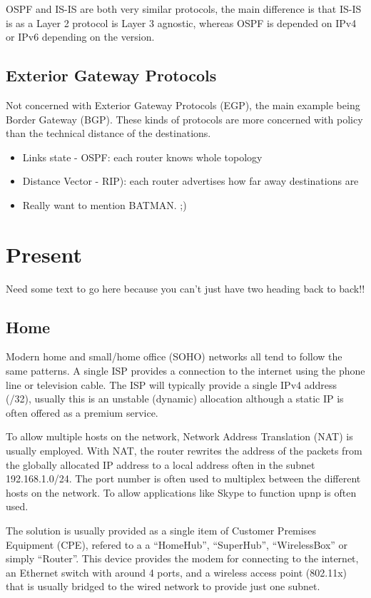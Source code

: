 \documentclass[12pt]{report}
\begin{document}
OSPF and IS-IS are both very similar protocols, the main difference is that
IS-IS is as a Layer 2 protocol is Layer 3 agnostic, whereas OSPF is depended on
IPv4 or IPv6 depending on the version.

\subsection{Exterior Gateway Protocols}
Not concerned with Exterior Gateway Protocols (EGP), the main example being
Border Gateway (BGP). These kinds of protocols are more concerned with policy
than the technical distance of the destinations.

\begin{itemize}
\item Links state - OSPF: each router knows whole topology
\item Distance Vector - RIP): each router advertises how far away destinations are
\item Really want to mention BATMAN. ;)
\end{itemize}

\section{Present}
Need some text to go here because you can't just have two heading back to back!!

\subsection{Home}
Modern home and small/home office (SOHO) networks all tend to follow the same
patterns. A single ISP provides a connection to the internet using the phone
line or television cable.  The ISP will typically provide a single IPv4 address
(/32), usually this is an unstable (dynamic) allocation although a static IP is
often offered as a premium service. 

To allow multiple hosts on the network, Network Address Translation (NAT) is
usually employed. With NAT, the router rewrites the address of the packets from
the globally allocated IP address to a local address often in the subnet
192.168.1.0/24. The port number is often used to multiplex between the
different hosts on the network. To allow applications like Skype to function
upnp is often used. 

The solution is usually provided as a single item of Customer Premises
Equipment (CPE), refered to a a ``HomeHub'', ``SuperHub'', ``WirelessBox'' or
simply ``Router''. This device provides the modem for connecting to the
internet, an Ethernet switch with around 4 ports, and a wireless access point
(802.11x) that is usually bridged to the wired network to provide just one
subnet. 
\end{document}
